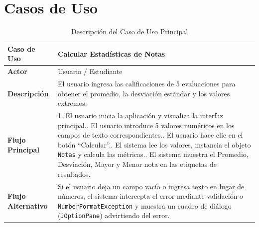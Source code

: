 \documentclass[12pt,a4paper]{article}
\begin{document}
\section{Casos de Uso}
\begin{table}[h]
    \centering
    \begin{tabular}{|p{3cm}|p{12cm}|}
    \hline
    \textbf{Caso de Uso} & \textbf{Calcular Estadísticas de Notas} \\ \hline
    \textbf{Actor} & Usuario / Estudiante \\ \hline
    \textbf{Descripción} & El usuario ingresa las calificaciones de 5 evaluaciones para obtener el promedio, la desviación estándar y los valores extremos. \\ \hline
    \textbf{Flujo Principal} & 
    1. El usuario inicia la aplicación y visualiza la interfaz principal.\newline
    2. El usuario introduce 5 valores numéricos en los campos de texto correspondientes.\newline
    3. El usuario hace clic en el botón ``Calcular''.\newline
    4. El sistema lee los valores, instancia el objeto \texttt{Notas} y calcula las métricas.\newline
    5. El sistema muestra el Promedio, Desviación, Mayor y Menor nota en las etiquetas de resultados. \\ \hline
    \textbf{Flujo Alternativo} & 
    Si el usuario deja un campo vacío o ingresa texto en lugar de números, el sistema intercepta el error mediante validación o \texttt{NumberFormatException} y muestra un cuadro de diálogo (\texttt{JOptionPane}) advirtiendo del error. \\ \hline
    \end{tabular}
    \caption{Descripción del Caso de Uso Principal}
\end{table}
\end{document}
